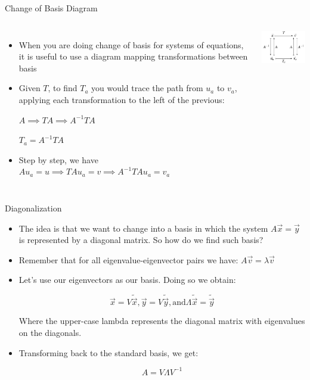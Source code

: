 \documentclass{beamer}
\begin{document}
	\begin{frame}{Change of Basis Diagram}
    	\begin{columns}[onlytextwidth,T]
        	\column{\dimexpr\linewidth-40mm-5mm}
        	    \begin{itemize}
        	        \item When you are doing change of basis for systems of equations, it is useful to use a diagram mapping transformations between basis
                    
                    \item Given $T$, to find $T_a$ you would trace the path from $u_a$ to $v_a$, applying each transformation to the left of the previous:
                    
                    $A \implies TA \implies A^{-1}TA$
                    
                    $T_a = A^{-1}TA$
                    
                    \item Step by step, we have $Au_a = u \implies TAu_a = v \implies A^{-1}TAu_a = v_a$
        	    \end{itemize}
    	    
    	    \column{40mm}
    	        \includegraphics[width=40mm]{change-of-basis-diagram.jpeg}
	    \end{columns}
	\end{frame}
	
	\begin{frame}{Diagonalization}
	    \begin{itemize}
	        \item The idea is that we want to change into a basis in which the system $A\vec{x} = \vec{y}$ is represented by a diagonal matrix. So how do we find such basis?
	        
	        \item Remember that for all eigenvalue-eigenvector pairs we have: $A\vec{v} = \lambda\vec{v}$
	        
	        \item Let’s use our eigenvectors as our basis. Doing so we obtain:
	        
	        $$\vec{x} = V\tilde{\vec{x}}, \vec{y} = V\tilde{\vec{y}}, \text{and} \Lambda\tilde{\vec{x}} = \tilde{\vec{y}}$$
	        
	        Where the upper-case lambda represents the diagonal matrix with eigenvalues on the diagonals.
	        
	        \item Transforming back to the standard basis, we get:
            
            $$A = V\Lambda{V^{-1}}$$
	    \end{itemize}
	\end{frame}
	
\end{document}
